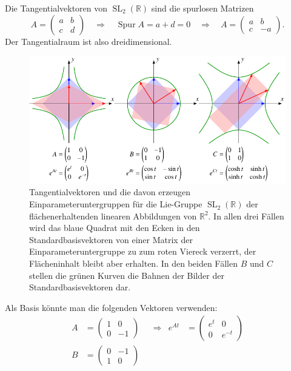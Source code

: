 \begin{beispiel}
Die Tangentialvektoren von $\operatorname{SL}_2(\mathbb{R})$ sind 
die spurlosen Matrizen
\[
A=\begin{pmatrix}a&b\\c&d\end{pmatrix}
\quad\Rightarrow\quad
\operatorname{Spur}A=a+d=0
\quad\Rightarrow\quad
A=\begin{pmatrix}a&b\\c&-a\end{pmatrix}.
\]
Der Tangentialraum ist also dreidimensional.
\begin{figure}
\centering
\includegraphics{chapters/60-gruppen/images/sl2.pdf}
\caption{Tangentialvektoren und die davon erzeugen Einparameteruntergruppen
für die Lie-Gruppe $\operatorname{SL}_2(\mathbb{R})$ der flächenerhaltenden
linearen Abbildungen von $\mathbb{R}^2$.
In allen drei Fällen wird das blaue Quadrat mit den Ecken in den
Standardbasisvektoren von einer Matrix der Einparameteruntergruppe zu
zum roten Viereck verzerrt, der Flächeninhalt bleibt aber erhalten.
In den beiden Fällen $B$ und $C$ stellen die grünen Kurven die Bahnen
der Bilder der Standardbasisvektoren dar.
\label{buch:gruppen:fig:sl2}}
\end{figure}%
Als Basis könnte man die folgenden Vektoren verwenden:
\begin{align*}
A
&=
\begin{pmatrix}1&0\\0&-1\end{pmatrix}
&&\Rightarrow&
e^{At}
&=
\begin{pmatrix} e^t & 0 \\ 0 & e^{-t} \end{pmatrix}
\\
B
&=
\begin{pmatrix}0&-1\\1&0\end{pmatrix}

\end{align*}
\end{beispiel}
